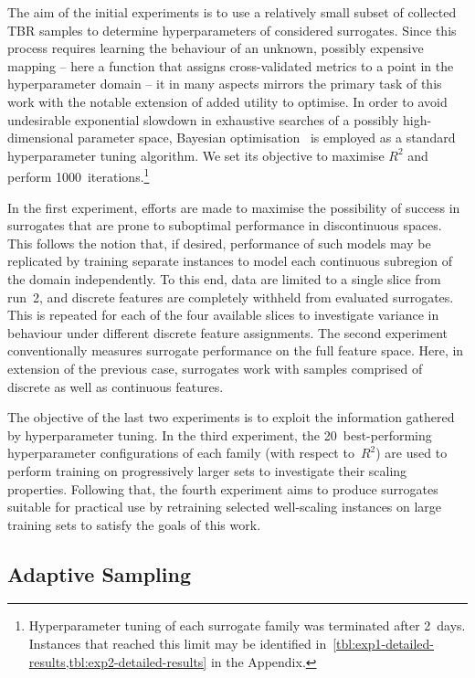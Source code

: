 The aim of the initial experiments is to use a relatively small subset of
collected TBR samples to determine hyperparameters of considered surrogates.
Since this process requires learning the behaviour of an unknown, possibly
expensive mapping -- here a function that assigns cross-validated metrics to a
point in the hyperparameter domain -- it in many aspects mirrors
the primary task of this work with the notable extension of added utility
to optimise. In order to avoid undesirable exponential slowdown in exhaustive
searches of a possibly high-dimensional parameter space, Bayesian
optimisation~\cite{movckus1975bayesian} is employed as a standard hyperparameter tuning algorithm. We set
its objective to maximise $R^2$ and perform
1000~iterations.\footnote{Hyperparameter tuning of each surrogate family was
	terminated after 2~days. Instances that reached this limit may be identified
	in~\cref{tbl:exp1-detailed-results,tbl:exp2-detailed-results} in the
	Appendix.}

In the first experiment, efforts are made to maximise the possibility of success
in surrogates that are prone to suboptimal performance in discontinuous spaces.
This follows the notion that, if desired, performance of such models may be
replicated by training separate instances to model each continuous subregion of
the domain independently.
To this end, data are limited to a single slice from run~2, and discrete
features are completely withheld from evaluated
surrogates. This is repeated for each of the four available slices to
investigate variance in behaviour under different discrete feature assignments.
The second experiment conventionally measures surrogate performance on the full
feature space. Here, in extension of the previous case, surrogates work with
samples comprised of discrete as well as continuous features.

The objective of the last two experiments is to exploit the information gathered by
hyperparameter tuning. In the third experiment, the 20~best-performing
hyperparameter configurations of each family (with respect to~$R^2$) are used to
perform training on progressively larger sets to investigate their scaling
properties. Following that, the fourth experiment aims to produce surrogates
suitable for practical use by retraining selected well-scaling instances on large
training sets to satisfy the goals of this work.


\subsection{Adaptive Sampling}
\label{sec:adaptive}

